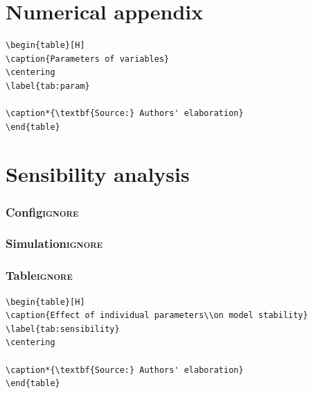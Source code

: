 \documentclass[12pt]{article}
\begin{document}
\appendix

\section{Numerical appendix}
\label{sec:org9ddcf83}
\label{append:Data}


\begin{verbatim}
\begin{table}[H]
\caption{Parameters of variables}
\centering
\label{tab:param}

\caption*{\textbf{Source:} Authors' elaboration}
\end{table}
\end{verbatim}

\section{Sensibility analysis}
\label{sec:org6a88096}
\label{append:Sensib}

\subsubsection{Config\hfill{}\textsc{ignore}}
\label{sec:org015b47a}

\subsubsection{Simulation\hfill{}\textsc{ignore}}
\label{sec:org375e9be}

\subsubsection{Table\hfill{}\textsc{ignore}}
\label{sec:org6f94ff9}


\begin{verbatim}
\begin{table}[H]
\caption{Effect of individual parameters\\on model stability}
\label{tab:sensibility}
\centering

\caption*{\textbf{Source:} Authors' elaboration}
\end{table}
\end{verbatim}
\end{document}
